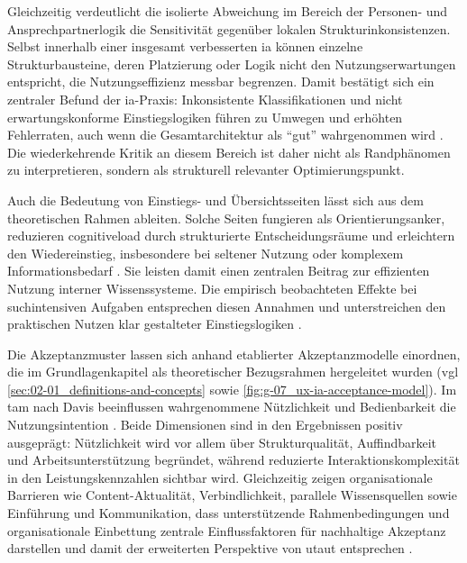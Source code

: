 Gleichzeitig verdeutlicht die isolierte Abweichung im Bereich der Personen- und Ansprechpartnerlogik die Sensitivität gegenüber lokalen Strukturinkonsistenzen. Selbst innerhalb einer insgesamt verbesserten \Gls{ia} können einzelne Strukturbausteine, deren Platzierung oder Logik nicht den Nutzungserwartungen entspricht, die Nutzungseffizienz messbar begrenzen. Damit bestätigt sich ein zentraler Befund der \Gls{ia}-Praxis: Inkonsistente Klassifikationen und nicht erwartungskonforme Einstiegslogiken führen zu Umwegen und erhöhten Fehlerraten, auch wenn die Gesamtarchitektur als \enquote{gut} wahrgenommen wird \cite{303:Rosenfeld2015,113:NNGIntranetGuidelines}. Die wiederkehrende Kritik an diesem Bereich ist daher nicht als Randphänomen zu interpretieren, sondern als strukturell relevanter Optimierungspunkt.

\newpage

Auch die Bedeutung von Einstiegs- und Übersichtsseiten lässt sich aus dem theoretischen Rahmen ableiten. Solche Seiten fungieren als Orientierungsanker, reduzieren \gls{cognitiveload} durch strukturierte Entscheidungsräume und erleichtern den Wiedereinstieg, insbesondere bei seltener Nutzung oder komplexem Informationsbedarf \cite{303:Rosenfeld2015,113:NNGIntranetGuidelines}. Sie leisten damit einen zentralen Beitrag zur effizienten Nutzung interner Wissenssysteme.
Die empirisch beobachteten Effekte bei suchintensiven Aufgaben entsprechen diesen Annahmen und unterstreichen den praktischen Nutzen klar gestalteter Einstiegslogiken \cite{307:DWGFindability,111:NNGSearchVisible}.

Die Akzeptanzmuster lassen sich anhand etablierter Akzeptanzmodelle einordnen, die im Grundlagenkapitel als theoretischer Bezugsrahmen hergeleitet wurden (\acrshort{vgl} \autoref{sec:02-01_definitions-and-concepts} sowie \autoref{fig:g-07_ux-ia-acceptance-model}). Im \acrshort{tam} nach Davis beeinflussen wahrgenommene Nützlichkeit und Bedienbarkeit die Nutzungsintention \cite{102:Davis1989}. Beide Dimensionen sind in den Ergebnissen positiv ausgeprägt: Nützlichkeit wird vor allem über Strukturqualität, Auffindbarkeit und Arbeitsunterstützung begründet, während reduzierte Interaktionskomplexität in den Leistungskennzahlen sichtbar wird. 
Gleichzeitig zeigen organisationale Barrieren wie Content-Aktualität, Verbindlichkeit, parallele Wissensquellen sowie Einführung und Kommunikation, dass unterstützende Rahmenbedingungen und organisationale Einbettung zentrale Einflussfaktoren für nachhaltige Akzeptanz darstellen und damit der erweiterten Perspektive von \acrshort{utaut} entsprechen \cite{103:Venkatesh2003,117:Horton2001}.

